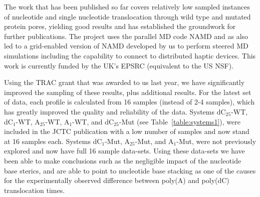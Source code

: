 \documentclass[a4paper,10pt]{article}
\newcommand{\dctfnsp}{dC$_{25}$}
\newcommand{\atfnsp}{A$_{25}$}
\newcommand{\dconsp}{dC$_{1}$}
\newcommand{\aonsp}{A$_{1}$}
\begin{document}
\begin{figure}[!h]
  \label{full_trans_local}
\end{figure}


The work that has been published so far covers relatively low sampled instances of nucleotide and single nucleotide translocation through wild type and mutated protein pores, yielding good results and has established the groundwork for further publications. The project uses the parallel MD code NAMD and as also led to a grid-enabled version of NAMD developed by us to perform steered MD simulations including the capability to connect to distributed haptic devices. This work is currently funded by the UK's EPSRC (equivalent to the US NSF).

Using the TRAC grant that was awarded to us last year, we have significantly improved the sampling of these results, plus additional results. For the latest set of data, each profile is calculated from 16 samples (instead of 2-4 samples), which has greatly improved the quality and reliability of the data. Systems \dctfnsp-WT,  \dconsp-WT, \atfnsp-WT,  \aonsp-WT,  and \dctfnsp-Mut (see Table~\ref{table:systems1}), were included in the JCTC publication with a low number of samples and now stand at 16 samples each. Systems \dconsp-Mut, \atfnsp-Mut, and \aonsp-Mut, were not previously explored and now have full 16 sample data-sets. Using these data-sets we have been able to make conclusions such as the negligible impact of the nucleotide base sterics, and are able to point to nucleotide base stacking as  one of the causes for the experimentally observed difference between poly(A) and poly(dC) translocation times.
\end{document}
